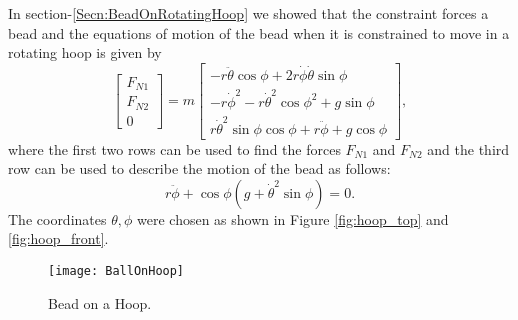 \documentclass[graybox,envcountchap,sectrefs]{svmonoMuga}
\begin{document}
In section-\ref{Secn:BeadOnRotatingHoop} we showed that the constraint forces a bead and the 
equations of motion of the bead when it is constrained to move in a rotating hoop is given by
\begin{equation}
\begin{bmatrix}
F_{N1}\\ F_{N2}\\ 0
\end{bmatrix}
=m\begin{bmatrix}
  -r\ddot{\theta}\cos{\phi} + 2r\dot{\phi}\dot{\theta}\sin{\phi}\\
 -r\dot{\phi}^2 - r\dot{\theta}^2\cos{\phi}^2 + g\sin{\phi} \\
    r\dot{\theta}^2\sin\phi\cos\phi + r\ddot{\phi} + g\cos{\phi}
\end{bmatrix},
\label{eq:F_values0}
\end{equation}
where the first two rows can be used to find the forces $F_{N1}$ and $F_{N2}$ and the third row can be used to describe the motion of the bead as follows:
\begin{equation}
r\ddot{\phi}+\cos{\phi}\left(g+\dot{\theta}^2\sin\phi\right)=0.
\label{eq:charac_eqn0}
\end{equation}
The coordinates $\theta, \phi$ were chosen as shown in Figure \ref{fig:hoop_top} and \ref{fig:hoop_front}. 

\begin{figure}[h]
\begin{center}
\texttt{[image: BallOnHoop]}
\renewcommand{\baselinestretch}{1}\selectfont
\caption{Bead on a Hoop.}
\label{Fig:BeadOnHoop}
\renewcommand{\baselinestretch}{1.5}\selectfont
\end{center}
\end{figure}
\end{document}
